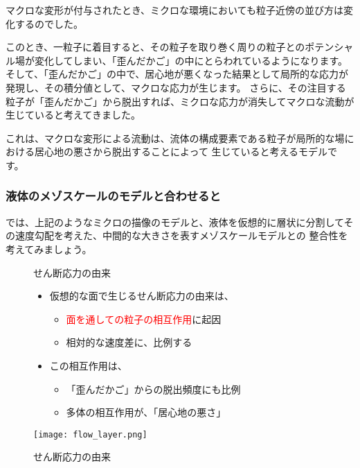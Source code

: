\documentclass[uplatex,dvipdfmx,a4paper,11pt]{jsreport}
\begin{document}
マクロな変形が付与されたとき、ミクロな環境においても粒子近傍の並び方は変化するのでした。

このとき、一粒子に着目すると、その粒子を取り巻く周りの粒子とのポテンシャル場が変化してしまい、「歪んだかご」の中にとらわれているようになります。
そして、「歪んだかご」の中で、居心地が悪くなった結果として局所的な応力が発現し、その積分値として、マクロな応力が生じます。
さらに、その注目する粒子が「歪んだかご」から脱出すれば、ミクロな応力が消失してマクロな流動が生じていると考えてきました。

これは、マクロな変形による流動は、流体の構成要素である粒子が局所的な場における居心地の悪さから脱出することによって
生じていると考えるモデルです。

\subsubsection{液体のメゾスケールのモデルと合わせると}
では、上記のようなミクロの描像のモデルと、液体を仮想的に層状に分割してその速度勾配を考えた、中間的な大きさを表すメゾスケールモデルとの
整合性を考えてみましょう。
\begin{figure}[htb]
	\begin{center}
		\begin{minipage}{0.52\textwidth}
			\begin{itembox}[l]{せん断応力の由来}
				\begin{itemize}
					\item 仮想的な面で生じるせん断応力の由来は、
					\begin{itemize}
						\item \textcolor{red}{面を通しての粒子の相互作用}に起因
						\item 相対的な速度差に、比例する
					\end{itemize}
					\item この相互作用は、
					\begin{itemize}
						\item 「歪んだかご」からの脱出頻度にも比例
						\item 多体の相互作用が、「居心地の悪さ」
					\end{itemize}
				\end{itemize}
			\end{itembox}
		\end{minipage}
		\begin{minipage}{0.4\textwidth}
			\begin{center}
			\texttt{[image: flow\_layer.png]}
			\end{center}
		\end{minipage}
		\caption{せん断応力の由来}
		\label{fig:origin_stress}
	\end{center}
\end{figure}
\end{document}
